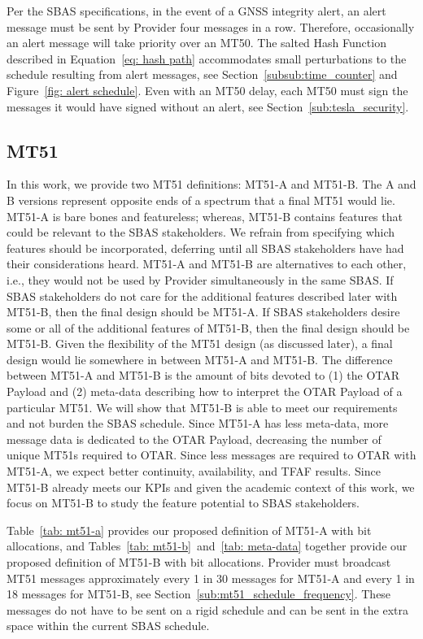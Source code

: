 \documentclass[letterpaper,times]{IONconf/IONconf}
\begin{document}
		Per the SBAS specifications, in the event of a GNSS integrity alert, an alert message must be sent by Provider four messages in a row.
		Therefore,  occasionally an alert message will take priority over an MT50.
		The salted Hash Function described in Equation~\eqref{eq: hash path} accommodates small perturbations to the schedule resulting from alert messages, see Section~\ref{subsub:time_counter} and Figure~\ref{fig: alert schedule}.
		Even with an MT50 delay, each MT50 must sign the messages it would have signed without an alert, see Section~\ref{sub:tesla_security}.

	\subsection{MT51} \label{sub:mt51}

		In this work, we provide two MT51 definitions: MT51-A and MT51-B.
		The A and B versions represent opposite ends of a spectrum that a final MT51 would lie.
		MT51-A is bare bones and featureless; whereas, MT51-B contains features that could be relevant to the SBAS stakeholders.
		We refrain from specifying which features should be incorporated, deferring until all SBAS stakeholders have had their considerations heard.
		MT51-A and MT51-B are alternatives to each other, i.e., they would not be used by Provider simultaneously in the same SBAS.
		If SBAS stakeholders do not care for the additional features described later with MT51-B, then the final design should be MT51-A.
		If SBAS stakeholders desire some or all of the additional features of MT51-B, then the final design should be MT51-B.
		Given the flexibility of the MT51 design (as discussed later), a final design would lie somewhere in between MT51-A and MT51-B.
		The difference between MT51-A and MT51-B is the amount of bits devoted to (1) the OTAR Payload and (2) meta-data describing how to interpret the OTAR Payload of a particular MT51.
		We will show that MT51-B is able to meet our requirements and not burden the SBAS schedule.
		Since MT51-A has less meta-data, more message data is dedicated to the OTAR Payload, decreasing the number of unique MT51s required to OTAR.
		Since less messages are required to OTAR with MT51-A, we expect better continuity, availability, and TFAF results.
		Since MT51-B already meets our KPIs and given the academic context of this work, we focus on MT51-B to study the feature potential to SBAS stakeholders.

		Table~\ref{tab: mt51-a} provides our proposed definition of MT51-A with bit allocations, and Tables~\ref{tab: mt51-b}~and~\ref{tab: meta-data} together provide our proposed definition of MT51-B with bit allocations.
		Provider must broadcast MT51 messages approximately every 1 in 30 messages for MT51-A and every 1 in 18 messages for MT51-B, see Section~\ref{sub:mt51_schedule_frequency}.
		These messages do not have to be sent on a rigid schedule and can be sent in the extra space within the current SBAS schedule.
\end{document}
